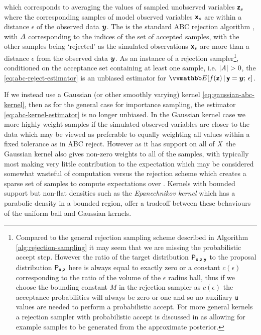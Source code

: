 which corresponds to averaging the values of sampled unobserved variables $\boldsymbol{\mathsf{z}}_s$ where the corresponding samples of model observed variables $\boldsymbol{\mathsf{x}}_s$ are within a distance $\epsilon$ of the observed data $\boldsymbol{y}$. The is the standard \ac{ABC} rejection algorithm \citep{rubin1984bayesianly,tavare1997inferring,fu1997estimating,weiss1998inference,pritchard1999population} , with $\mathit{A}$ corresponding to the indices of the set of accepted samples, with the other samples being `rejected' as the simulated observations $\boldsymbol{\mathsf{x}}_s$ are more than a distance $\epsilon$ from the observed data $\boldsymbol{y}$. As an instance of a rejection sampler\footnote{Compared to the general rejection sampling scheme described in Algorithm \ref{alg:rejection-sampling} it may seem that we are missing the probabilistic accept step. However the ratio of the target distribution $\mathsf{P}_{\boldsymbol{\mathsf{x}},\boldsymbol{\mathsf{z}}|\boldsymbol{\mathsf{y}}}$ to the proposal distribution $\mathsf{P}_{\boldsymbol{\mathsf{x}},\boldsymbol{\mathsf{z}}}$ here is always equal to exactly zero or a constant $c(\epsilon)$ corresponding to the ratio of the volume of the $\epsilon$ radius ball, thus if we choose the bounding constant $M$ in the rejection sampler as $c(\epsilon)$ the acceptance probabilities will always be zero or one and so no auxiliary $\mathsf{u}$ values are needed to perform a probabilistic accept. For more general kernels a rejection sampler with probabilistic accept is discussed in \citep{wilkinson2013approximate} as allowing for example samples to be generated from the approximate posterior.}, conditioned on the acceptance set containing at least one sample, i.e. $|\mathit{A}| > 0$, the \eqref{eq:abc-reject-estimator} is an unbiased estimator for $\expc{f(\rvct{z}) \gvn \rvct{y} = \vct{y};\,\epsilon}$.

If we instead use a Gaussian (or other smoothly varying) kernel \eqref{eq:gaussian-abc-kernel}, then as for the general case for importance sampling, the estimator \eqref{eq:abc-kernel-estimator} is no longer unbiased. In the Gaussian kernel case we more highly weight samples if the simulated observed variables are closer to the data which may be viewed as preferable to equally weighting all values within a fixed tolerance as in \ac{ABC} reject. However as it has support on all of $\mathit{X}$ the Gaussian kernel also gives non-zero weights to all of the samples, with typically most making very little contribution to the expectation which may be considered somewhat wasteful of computation versus the rejection scheme which creates a sparse set of samples to compute expectations over \citep{beaumont2002approximate}. Kernels with bounded support but non-flat densities such as the \emph{Epanechnikov kernel} \citep{epanechnikov1969non} which has a parabolic density in a bounded region, offer a tradeoff between these behaviours of the uniform ball and Gaussian kernels.

